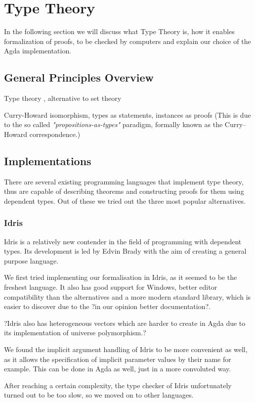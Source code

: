 \section{Type Theory}
In the following section we will discuss what Type Theory is, how it enables formalization of proofs, to be checked by computers and explain our choice of the Agda implementation.

\subsection{General Principles Overview}
Type theory , alternative to set theory

Curry-Howard isomorphism, types as statements, instances as proofs
(This is due to the so called \textit{"propositions-as-types"} paradigm, formally known as the Curry–Howard correspondence.)

\subsection{Implementations}
There are several existing programming languages that implement type theory, thus are capable of describing theorems and constructing proofs for them using dependent types. Out of these we tried out the three most popular alternatives.

\subsubsection{Idris}
Idris\cite{Brady2013IdrisAG} is a relatively new contender in the field of programming with dependent types. Its development is led by Edvin Brady with the aim of creating a general purpose language.

We first tried implementing our formalisation in Idris, as it seemed to be the freshest language. It also has good support for Windows, better editor compatibility than the alternatives and a more modern standard library, which is easier to discover due to the ?in our opinion better documentation?.

?Idris also has heterogeneous vectors which are harder to create in Agda due to its implementation of universe polymorphism.?

We found the implicit argument handling of Idris to be more convenient as well, as it allows the specification of implicit parameter values by their name for example. This can be done in Agda as well, just in a more convoluted way.

After reaching a certain complexity, the type checker of Idris unfortunately turned out to be too slow, so we moved on to other languages.

